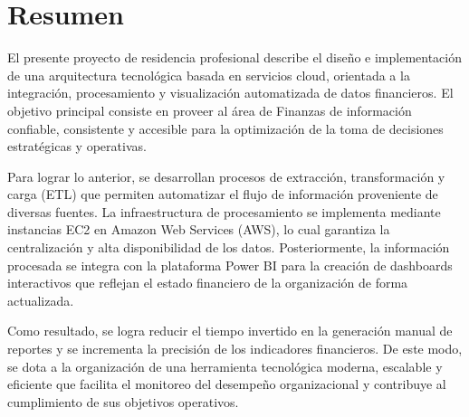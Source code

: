 \chapter*{Resumen}

El presente proyecto de residencia profesional describe el diseño e implementación de una arquitectura tecnológica basada en servicios cloud, orientada a la integración, procesamiento y visualización automatizada de datos financieros. El objetivo principal consiste en proveer al área de Finanzas de información confiable, consistente y accesible para la optimización de la toma de decisiones estratégicas y operativas.

Para lograr lo anterior, se desarrollan procesos de extracción, transformación y carga (ETL) que permiten automatizar el flujo de información proveniente de diversas fuentes. La infraestructura de procesamiento se implementa mediante instancias EC2 en Amazon Web Services (AWS), lo cual garantiza la centralización y alta disponibilidad de los datos. Posteriormente, la información procesada se integra con la plataforma Power BI para la creación de dashboards interactivos que reflejan el estado financiero de la organización de forma actualizada.

Como resultado, se logra reducir el tiempo invertido en la generación manual de reportes y se incrementa la precisión de los indicadores financieros. De este modo, se dota a la organización de una herramienta tecnológica moderna, escalable y eficiente que facilita el monitoreo del desempeño organizacional y contribuye al cumplimiento de sus objetivos operativos.

